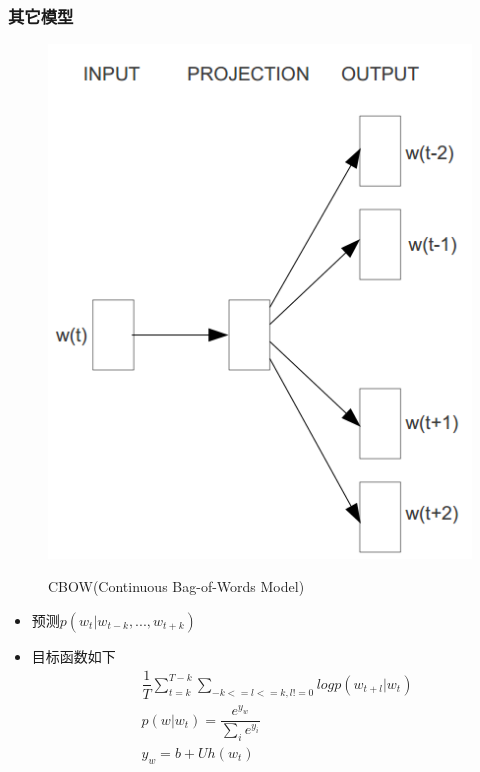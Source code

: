 \documentclass[notheorems]{beamer}
\begin{document}
\begin{frame}
\frametitle{其它模型}
 \begin{minipage}[t]{0.4\linewidth}
 \centering
     \begin{figure}
      \scalebox{0.30}
      {
        \includegraphics{./figure/Skip-Gram.png}
      }
      \caption{CBOW(Continuous Bag-of-Words Model)}
    \end{figure}
 \end{minipage}%
\begin{minipage}[t]{0.5\linewidth}
\centering
\begin{itemize}
\item 预测$p(w_{t}|w_{t-k},...,w_{t+k})$
\item 目标函数如下
\begin{equation}
\begin{aligned}
& \dfrac{1}{T}\sum_{t=k}^{T-k}\sum_{-k<=l<=k,l!=0}logp(w_{t+l}|w_{t})\\
& p(w|w_{t})=\dfrac{e^{y_{w}}}{\sum_{i}e^{y_{i}}}\\
& y_{w}=b + Uh(w_{t})
\end{aligned}
\end{equation}
\end{itemize}

\end{minipage}     
\end{frame}
\end{document}
